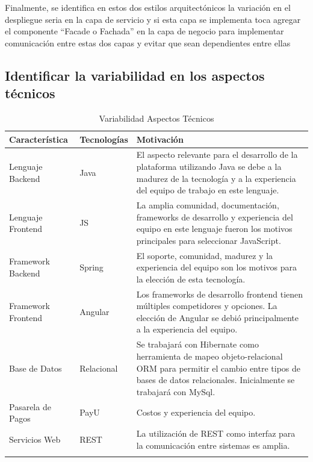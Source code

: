 \documentclass[10pt,a4paper,openany]{book}
\begin{document}
Finalmente, se identifica en estos dos estilos arquitectónicos la variación en el despliegue seria en la capa de servicio y si esta capa se implementa toca agregar el componente “Facade o Fachada” en la capa de negocio para implementar comunicación entre estas dos capas y evitar que sean dependientes entre ellas   

\subsection{Identificar la variabilidad en los aspectos técnicos}

\begin{longtable}{|p{2cm}|p{2cm}|p{8cm}|} \hline
Característica & Tecnologías& Motivación\\[0.5ex] \hline
Lenguaje Backend & Java& El aspecto relevante para el desarrollo de la plataforma utilizando Java se debe a la madurez de la tecnología y a la experiencia del equipo de trabajo en este lenguaje.\\[0.5ex] \hline
Lenguaje Frontend & JS& La amplia comunidad, documentación, frameworks de desarrollo y experiencia del equipo en este lenguaje fueron los motivos principales para seleccionar JavaScript.\\[0.5ex] \hline
Framework Backend &  Spring& El soporte, comunidad, madurez y la experiencia del equipo son los motivos para la elección de esta tecnología.\\[0.5ex] \hline
Framework Frontend &  Angular& Los frameworks de desarrollo frontend tienen múltiples competidores y opciones. La elección de Angular se debió principalmente a la experiencia del equipo.\\[0.5ex] \hline
Base de Datos &  Relacional& Se trabajará con Hibernate como herramienta de mapeo objeto-relacional ORM para permitir el cambio entre tipos de bases de datos relacionales. Inicialmente se trabajará con MySql.\\[0.5ex] \hline
Pasarela de Pagos & PayU& Costos y experiencia del equipo.\\[0.5ex] \hline
Servicios Web & REST& La utilización de REST como interfaz para la comunicación entre sistemas es amplia. \\[0.5ex] \hline
\caption{Variabilidad Aspectos Técnicos}
\label{table:t6}
\end{longtable}
\end{document}
